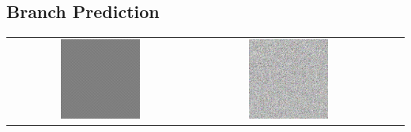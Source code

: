 \subsection{Branch Prediction}

\begin{center}
	\begin{tabular}{cccc}
	  \includegraphics[width=0.45\textwidth]{imagenes/antiTEMP.jpg} &
	  \includegraphics[width=0.45\textwidth]{imagenes/random.jpg} \\
	\end{tabular}
   \end{center}

